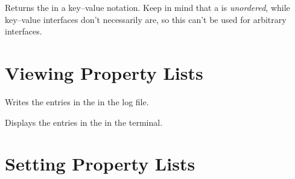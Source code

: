 \documentclass[oneside]{book}
\let\tn=\cs
\begin{document}
\begin{function}{\PropToKeyval}
\begin{syntax}
 
\end{syntax}
Returns the  in a key--value notation. Keep in mind
that a  is \emph{unordered}, while key--value interfaces
don't necessarily are, so this can't be used for arbitrary interfaces.
\begin{codehigh}
\PropToKeyval \lTmpaProp
\end{codehigh}
\end{function}

\section{Viewing Property Lists}

\begin{function}{\PropVarLog}
\begin{syntax}
 
\end{syntax}
Writes the entries in the  in the log file.
\begin{codehigh}
\PropVarLog \lTmpaProp
\end{codehigh}
\end{function}

\begin{function}{\PropVarShow}
\begin{syntax}
 
\end{syntax}
Displays the entries in the  in the terminal.
\begin{codehigh}
\PropVarShow \lTmpaProp
\end{codehigh}
\end{function}

\section{Setting Property Lists}
\end{document}
